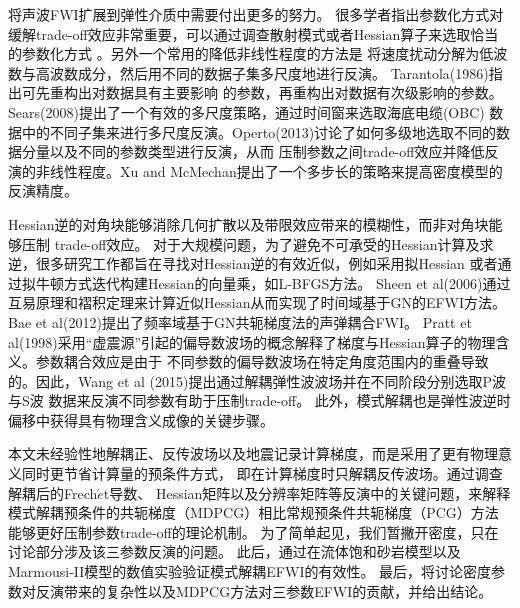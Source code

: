 将声波FWI扩展到弹性介质中需要付出更多的努力。
很多学者指出参数化方式对缓解trade-off效应非常重要，可以通过调查散射模式或者Hessian算子来选取恰当的参数化方式
\cite[]{wu.aki:1985,tarantola:1986,plessix.cao:2011,gholami2013}。另外一个常用的降低非线性程度的方法是
将速度扰动分解为低波数与高波数成分，然后用不同的数据子集多尺度地进行反演\cite[]{symes.carazzone:1991,bunks1995multiscale,clement:2001,shin.cha:2008,dehoop:2012,
xu:2012,biondi.almomin:2013,ma2013,warner2016adaptive,alkhalifah2015scattering}。
Tarantola(1986)\cite{tarantola:1986}指出可先重构出对数据具有主要影响
的参数，再重构出对数据有次级影响的参数。Sears(2008)\cite{sears2008}提出了一个有效的多尺度策略，通过时间窗来选取海底电缆(OBC)
数据中的不同子集来进行多尺度反演。Operto(2013)\cite{operto2013guided}讨论了如何多级地选取不同的数据分量以及不同的参数类型进行反演，从而
压制参数之间trade-off效应并降低反演的非线性程度。Xu and McMechan\cite{xu.mcmechan:2014}提出了一个多步长的策略来提高密度模型的反演精度。

Hessian逆的对角块能够消除几何扩散以及带限效应带来的模糊性，而非对角块能够压制
trade-off效应\cite[]{pratt1998gauss,fichtner2011hessian,operto2013guided,innanen2014seismic,pan2015estimation}。
对于大规模问题，为了避免不可承受的Hessian计算及求逆，很多研究工作都旨在寻找对Hessian逆的有效近似，例如采用拟Hessian\cite[]{shin2001improved,choi.shin:2008}
或者通过拟牛顿方式迭代构建Hessian的向量乘，如L-BFGS方法\cite[]{nocedal2006numerical,brossier2009}。
Sheen et al(2006)\cite{sheen:2006}通过互易原理和褶积定理来计算近似Hessian从而实现了时间域基于GN的EFWI方法。
Bae et al(2012)\cite{bae:2012}提出了频率域基于GN共轭梯度法的声弹耦合FWI。
Pratt et al(1998)\cite{pratt1998gauss}采用“虚震源”引起的偏导数波场的概念解释了梯度与Hessian算子的物理含义。参数耦合效应是由于
不同参数的偏导数波场在特定角度范围内的重叠导致的。因此，Wang et al (2015)\cite{wang:2015}提出通过解耦弹性波波场并在不同阶段分别选取P波与S波
数据来反演不同参数有助于压制trade-off。%
此外，模式解耦也是弹性波逆时偏移中获得具有物理含义成像的关键步骤\cite{yan:2008,wang2016scalar}。

本文未经验性地解耦正、反传波场以及地震记录\cite{ren.liu:2016}计算梯度，而是采用了更有物理意义同时更节省计算量的预条件方式，
即在计算梯度时只解耦反传波场。通过调查解耦后的Frech{$\acute{e}$}t导数、
Hessian矩阵以及分辨率矩阵等反演中的关键问题，来解释模式解耦预条件的共轭梯度（MDPCG）相比常规预条件共轭梯度（PCG）方法能够更好压制参数trade-off的理论机制。
为了简单起见，我们暂撇开密度，只在讨论部分涉及该三参数反演的问题。
此后，通过在流体饱和砂岩模型以及Marmousi-II模型的数值实验验证模式解耦EFWI的有效性。
最后，将讨论密度参数对反演带来的复杂性以及MDPCG方法对三参数EFWI的贡献，并给出结论。
\clearpage

